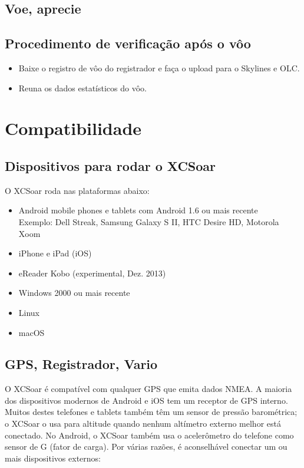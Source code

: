 \subsection*{Voe, aprecie}
\vspace{4em}

\subsection*{Procedimento de verificação após o vôo}
\begin{itemize}
\item Baixe o registro de vôo do registrador e faça o upload para o Skylines e OLC.
\item Reuna os dados estatísticos do vôo.
\end{itemize}
\newpage




\section{Compatibilidade}

\subsection*{Dispositivos para rodar o XCSoar}

O XCSoar roda nas plataformas abaixo:

\begin{itemize}
\item Android mobile phones e tablets com Android 1.6 ou mais recente \\
  Exemplo: Dell Streak, Samsung Galaxy S II, HTC Desire HD,
  Motorola Xoom
\item iPhone e iPad (iOS)
\item eReader Kobo (experimental, Dez. 2013)
\item Windows 2000 ou mais recente
\item Linux
\item macOS
\end{itemize}

\subsection*{GPS, Registrador, Vario}

O XCSoar é compatível com qualquer GPS que emita dados NMEA.  A maioria dos dispositivos modernos de Android e iOS tem um receptor de GPS interno.  Muitos destes telefones e tablets também têm um sensor de pressão barométrica; o XCSoar o usa para altitude quando nenhum altímetro externo melhor está conectado.  No Android, o XCSoar também usa o acelerômetro do telefone como sensor de G (fator de carga).  Por várias razões, é aconselhável conectar um ou mais dispositivos externos:

